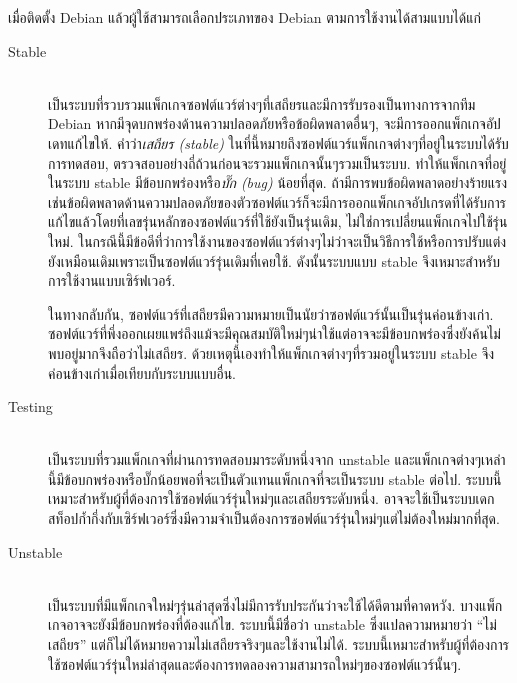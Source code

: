 \begin{thwbr}
{เมื่อติดตั้ง Debian แล้วผู้ใช้สามารถเลือกประเภทของ Debian ตามการใช้งานได้สามแบบได้แก่
\begin{description}
\item[Stable] \mbox{}\\
เป็นระบบที่รวบรวมแพ็กเกจซอฟต์แวร์ต่างๆที่เสถียรและมีการรับรองเป็นทางการจากทีม Debian หากมีจุดบกพร่องด้านความปลอดภัยหรือข้อผิดพลาดอื่นๆ, จะมีการออกแพ็กเกจอัปเดทแก้ไขให้. คำว่า\emph{เสถียร (stable)} ในที่นี้หมายถึงซอฟต์แวร์แพ็กเกจต่างๆที่อยู่ในระบบได้รับการทดสอบ, ตรวจสอบอย่างถี่ถ้วนก่อนจะรวมแพ็กเกจนั้นๆรวมเป็นระบบ. ทำให้แพ็กเกจที่อยู่ในระบบ stable มีข้อบกพร่องหรือ\emph{บั๊ก (bug)} %
%
น้อยที่สุด. ถ้ามีการพบข้อผิดพลาดอย่างร้ายแรงเช่นข้อผิดพลาดด้านความปลอดภัยของตัวซอฟต์แวร์ก็จะมีการออกแพ็กเกจอัปเกรดที่ได้รับการแก้ไขแล้วโดยที่เลขรุ่นหลักของซอฟต์แวร์ที่ใช้ยังเป็นรุ่นเดิม, ไม่ใช่การเปลี่ยนแพ็กเกจไปใช้รุ่นใหม่. ในกรณีนี้มีข้อดีที่ว่าการใช้งานของซอฟต์แวร์ต่างๆไม่ว่าจะเป็นวิธีการใช้หรือการปรับแต่งยังเหมือนเดิมเพราะเป็นซอฟต์แวร์รุ่นเดิมที่เคยใช้. ดังนั้นระบบแบบ stable จึงเหมาะสำหรับการใช้งานแบบเซิร์ฟเวอร์. 

ในทางกลับกัน, ซอฟต์แวร์ที่เสถียรมีความหมายเป็นนัยว่าซอฟต์แวร์นั้นเป็นรุ่นค่อนข้างเก่า. ซอฟต์แวร์ที่พึ่งออกเผยแพร่ถึงแม้จะมีคุณสมบัติใหม่ๆน่าใช้แต่อาจจะมีข้อบกพร่องซึ่งยังค้นไม่พบอยู่มากจึงถือว่าไม่เสถียร. ด้วยเหตุนี้เองทำให้แพ็กเกจต่างๆที่รวมอยู่ในระบบ stable จึงค่อนข้างเก่าเมื่อเทียบกับระบบแบบอื่น.

\item[Testing] \mbox{}\\
เป็นระบบที่รวมแพ็กเกจที่ผ่านการทดสอบมาระดับหนึ่งจาก unstable และแพ็กเกจต่างๆเหล่านี้มีข้อบกพร่องหรือบั๊กน้อยพอที่จะเป็นตัวแทนแพ็กเกจที่จะเป็นระบบ stable ต่อไป. ระบบนี้เหมาะสำหรับผู้ที่ต้องการใช้ซอฟต์แวร์รุ่นใหม่ๆและเสถียรระดับหนึ่ง. อาจจะใช้เป็นระบบเดกสท็อปก้ำกึ่งกับเซิร์ฟเวอร์ซึ่งมีความจำเป็นต้องการซอฟต์แวร์รุ่นใหม่ๆแต่ไม่ต้องใหม่มากที่สุด.
\item[Unstable] \mbox{}\\
เป็นระบบที่มีแพ็กเกจใหม่ๆรุ่นล่าสุดซึ่งไม่มีการรับประกันว่าจะใช้ได้ดีตามที่คาดหวัง. บางแพ็กเกจอาจจะยังมีข้อบกพร่องที่ต้องแก้ไข. ระบบนี้มีชื่อว่า unstable ซึ่งแปลความหมายว่า ``ไม่เสถียร'' แต่ก็ไม่ได้หมายความไม่เสถียรจริงๆและใช้งานไม่ได้. ระบบนี้เหมาะสำหรับผู้ที่ต้องการใช้ซอฟต์แวร์รุ่นใหม่ล่าสุดและต้องการทดลองความสามารถใหม่ๆของซอฟต์แวร์นั้นๆ.
\end{description}

}
\end{thwbr}
